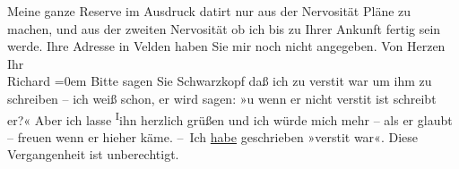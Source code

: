 \begin{ledgroupsized}[t]{13cm}
           \pstart
           Meine ganze Reserve im Ausdruck datirt nur aus der Nervosi{\pb}tät Pläne zu machen, und aus der
                  zweiten\strikeout{,} Nervosität ob ich bis zu Ihrer Ankunft
                  fertig sein werde. Ihre
               Adresse in Velden haben Sie mir noch nicht
               angegeben. Von Herzen\pend
           \pstart
           Ihr{\\[\baselineskip]}\spacefill\mbox{Richard}\pend
           \leftskip=0em{}\pstart
           \noindent{}Bitte sagen Sie Schwarzkopf daß ich zu
                     versti{\geminationm}t war um ihm zu schreiben – ich weiß schon,
                  er wird sagen: »u wenn er nicht {\pb}versti{\geminationm}t ist schreibt er?« Aber ich lasse \substVorne{}\textsuperscript{I}\substDazwischen{}i\substHinten{}hn herzlich grüßen und ich würde mich mehr – als er glaubt – freuen wenn
                  er hieher käme.\pend
           \pstart
           – Ich \uline{habe} geschrieben »versti{\geminationm}t war«. Diese Vergangenheit ist unberechtigt.\pend
           
         
         \endnumbering{}\end{ledgroupsized}  \newcommand{\dateiname}{L00942}\newcommand{\titel}{Richard Beer-Hofmann an Arthur Schnitzler, 14. 7. 1899}\newcommand{\editorInnen}{Martin Anton Müller und Gerd-Hermann Susen}
      